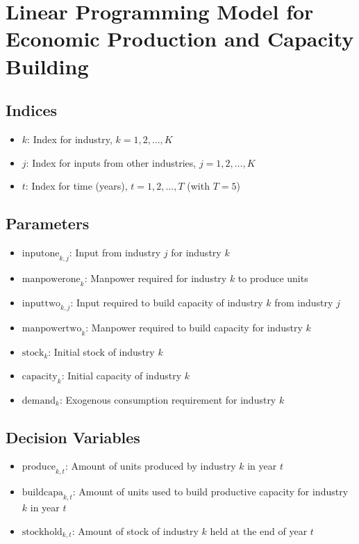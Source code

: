 \documentclass{article}
\begin{document}
\section*{Linear Programming Model for Economic Production and Capacity Building}

\subsection*{Indices}
\begin{itemize}
    \item \( k \): Index for industry, \( k = 1, 2, \ldots, K \)
    \item \( j \): Index for inputs from other industries, \( j = 1, 2, \ldots, K \)
    \item \( t \): Index for time (years), \( t = 1, 2, \ldots, T \) (with \( T = 5 \))
\end{itemize}

\subsection*{Parameters}
\begin{itemize}
    \item \( \text{inputone}_{k, j} \): Input from industry \( j \) for industry \( k \) 
    \item \( \text{manpowerone}_{k} \): Manpower required for industry \( k \) to produce units
    \item \( \text{inputtwo}_{k, j} \): Input required to build capacity of industry \( k \) from industry \( j \)
    \item \( \text{manpowertwo}_{k} \): Manpower required to build capacity for industry \( k \)
    \item \( \text{stock}_{k} \): Initial stock of industry \( k \)
    \item \( \text{capacity}_{k} \): Initial capacity of industry \( k \)
    \item \( \text{demand}_{k} \): Exogenous consumption requirement for industry \( k \)
\end{itemize}

\subsection*{Decision Variables}
\begin{itemize}
    \item \( \text{produce}_{k, t} \): Amount of units produced by industry \( k \) in year \( t \)
    \item \( \text{buildcapa}_{k, t} \): Amount of units used to build productive capacity for industry \( k \) in year \( t \)
    \item \( \text{stockhold}_{k, t} \): Amount of stock of industry \( k \) held at the end of year \( t \)
\end{itemize}
\end{document}
